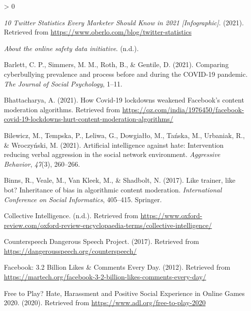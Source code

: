 \documentclass[
  10pt,
  dvipsnames,enabledeprecatedfontcommands]{scrartcl}
\newlength{\cslhangindent}
\newenvironment{CSLReferences}[2] %
 {%
  \setlength{\parindent}{0pt}
  \ifodd #1 \everypar{\setlength{\hangindent}{\cslhangindent}}\ignorespaces\fi
  \ifnum #2 > 0
  \setlength{\parskip}{#2\baselineskip}
  \fi
 }%
 {}
\begin{document}
\hypertarget{refs}{}
\begin{CSLReferences}{1}{0}
\leavevmode\hypertarget{ref-noauthor_10_2021}{}%
\emph{10 {Twitter} {Statistics} {Every} {Marketer} {Should} {Know} in
2021 {[}{Infographic}{]}}. (2021). Retrieved from
\url{https://www.oberlo.com/blog/twitter-statistics}

\leavevmode\hypertarget{ref-onlinesafetydata}{}%
\emph{About the online safety data initiative}. (n.d.).

\leavevmode\hypertarget{ref-barlett2021comparing}{}%
Barlett, C. P., Simmers, M. M., Roth, B., \& Gentile, D. (2021).
Comparing cyberbullying prevalence and process before and during the
COVID-19 pandemic. \emph{The Journal of Social Psychology}, 1--11.

\leavevmode\hypertarget{ref-bhattacharya}{}%
Bhattacharya, A. (2021). How {Covid}-19 lockdowns weakened {Facebook}'s
content moderation algorithms. Retrieved from
\url{https://qz.com/india/1976450/facebook-covid-19-lockdowns-hurt-content-moderation-algorithms/}

\leavevmode\hypertarget{ref-bilewicz2021artificial}{}%
Bilewicz, M., Tempska, P., Leliwa, G., Dowgiałło, M., Tańska, M.,
Urbaniak, R., \& Wroczyński, M. (2021). Artificial intelligence against
hate: Intervention reducing verbal aggression in the social network
environment. \emph{Aggressive Behavior}, \emph{47}(3), 260--266.

\leavevmode\hypertarget{ref-binns2017like}{}%
Binns, R., Veale, M., Van Kleek, M., \& Shadbolt, N. (2017). Like
trainer, like bot? Inheritance of bias in algorithmic content
moderation. \emph{International Conference on Social Informatics},
405--415. Springer.

\leavevmode\hypertarget{ref-noauthor_collective_nodate}{}%
Collective {Intelligence}. (n.d.). Retrieved from
\url{https://www.oxford-review.com/oxford-review-encyclopaedia-terms/collective-intelligence/}

\leavevmode\hypertarget{ref-noauthor_counterspeech_2017}{}%
Counterspeech {{}} {Dangerous} {Speech} {Project}. (2017). Retrieved
from \url{https://dangerousspeech.org/counterspeech/}

\leavevmode\hypertarget{ref-noauthor_facebook:_2012}{}%
Facebook: 3.2 {Billion} {Likes} \& {Comments} {Every} {Day}. (2012).
Retrieved from
\url{https://martech.org/facebook-3-2-billion-likes-comments-every-day/}

\leavevmode\hypertarget{ref-noauthor_free_nodate}{}%
Free to {Play}? {Hate}, {Harassment} and {Positive} {Social}
{Experience} in {Online} {Games} 2020. (2020). Retrieved from
\url{https://www.adl.org/free-to-play-2020}


\end{CSLReferences}
\end{document}
